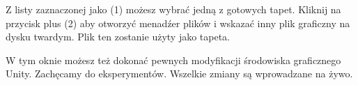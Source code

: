 Z listy zaznaczonej jako \textcolor{ubuntu_orange}{(}1\textcolor{ubuntu_orange}{)} możesz wybrać jedną z gotowych tapet. Kliknij na przycisk plus \textcolor{ubuntu_orange}{(}2\textcolor{ubuntu_orange}{)} aby otworzyć menadźer plików i wskazać inny plik graficzny na dysku twardym. Plik ten zostanie użyty jako tapeta.

W tym oknie możesz też dokonać pewnych modyfikacji środowiska graficznego Unity. Zachęcamy do eksperymentów. Wszelkie zmiany są wprowadzane na żywo.